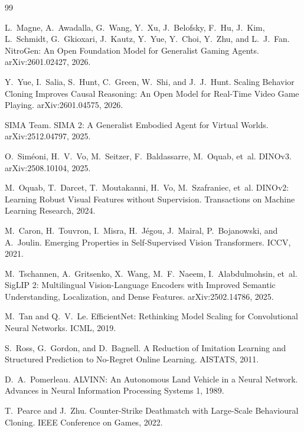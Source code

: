 \documentclass[11pt]{article}
\begin{document}
\small
\begin{thebibliography}{99}

L.~Magne, A.~Awadalla, G.~Wang, Y.~Xu, J.~Belofsky, F.~Hu, J.~Kim,
L.~Schmidt, G.~Gkioxari, J.~Kautz, Y.~Yue, Y.~Choi, Y.~Zhu, and L.~J.~Fan.
\newblock NitroGen: An Open Foundation Model for Generalist Gaming Agents.
\newblock arXiv:2601.02427, 2026.

Y.~Yue, I.~Salia, S.~Hunt, C.~Green, W.~Shi, and J.~J.~Hunt.
\newblock Scaling Behavior Cloning Improves Causal Reasoning: An Open Model for Real-Time Video Game Playing.
\newblock arXiv:2601.04575, 2026.

SIMA Team.
\newblock SIMA 2: A Generalist Embodied Agent for Virtual Worlds.
\newblock arXiv:2512.04797, 2025.

O.~Sim\'eoni, H.~V.~Vo, M.~Seitzer, F.~Baldassarre, M.~Oquab, et~al.
\newblock DINOv3.
\newblock arXiv:2508.10104, 2025.

M.~Oquab, T.~Darcet, T.~Moutakanni, H.~Vo, M.~Szafraniec, et~al.
\newblock DINOv2: Learning Robust Visual Features without Supervision.
\newblock Transactions on Machine Learning Research, 2024.

M.~Caron, H.~Touvron, I.~Misra, H.~J\'egou, J.~Mairal, P.~Bojanowski, and A.~Joulin.
\newblock Emerging Properties in Self-Supervised Vision Transformers.
\newblock ICCV, 2021.

M.~Tschannen, A.~Gritsenko, X.~Wang, M.~F.~Naeem, I.~Alabdulmohsin, et~al.
\newblock SigLIP 2: Multilingual Vision-Language Encoders with Improved Semantic Understanding, Localization, and Dense Features.
\newblock arXiv:2502.14786, 2025.

M.~Tan and Q.~V.~Le.
\newblock EfficientNet: Rethinking Model Scaling for Convolutional Neural Networks.
\newblock ICML, 2019.

S.~Ross, G.~Gordon, and D.~Bagnell.
\newblock A Reduction of Imitation Learning and Structured Prediction to No-Regret Online Learning.
\newblock AISTATS, 2011.

D.~A.~Pomerleau.
\newblock ALVINN: An Autonomous Land Vehicle in a Neural Network.
\newblock Advances in Neural Information Processing Systems 1, 1989.

T.~Pearce and J.~Zhu.
\newblock Counter-Strike Deathmatch with Large-Scale Behavioural Cloning.
\newblock IEEE Conference on Games, 2022.


\end{thebibliography}
\end{document}
